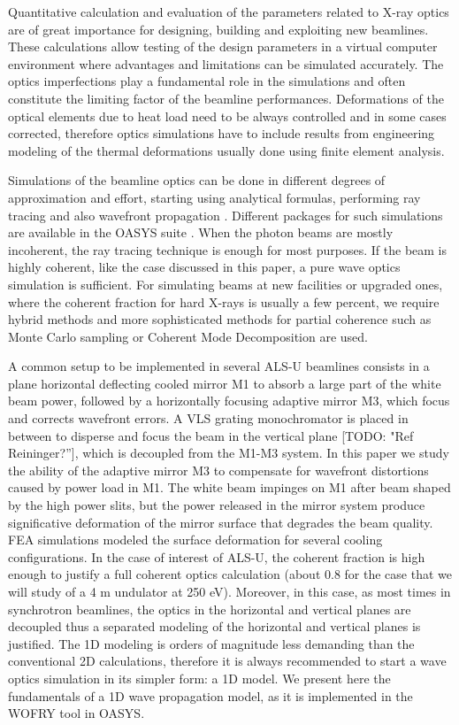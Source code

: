 \documentclass[]{spie}  %
\newcommand{\todo}[1]{{\color{red}[TODO: "#1'']}}
\begin{document}
Quantitative calculation and evaluation of the parameters related to X-ray optics are of great importance for designing, building and exploiting new beamlines. These calculations allow testing of the design parameters in a virtual computer environment where advantages and limitations can be simulated accurately. The optics imperfections play a fundamental role in the simulations and often constitute the limiting factor of the beamline performances. Deformations of the optical elements due to heat load need to be always controlled and in some cases corrected, therefore optics simulations have to include results from engineering modeling of the thermal deformations usually done using finite element analysis. 

Simulations of the beamline optics can be done in different degrees of approximation and effort, starting using analytical formulas, performing ray tracing and also wavefront propagation \cite{hyerarchical}. Different packages for such simulations are available in the OASYS suite \cite{codeOASYS}. When the photon beams are mostly incoherent, the ray tracing technique is enough for most purposes. If the beam is highly coherent, like the case discussed in this paper, a pure wave optics simulation is sufficient. For simulating beams at new facilities or upgraded ones, where the coherent fraction for hard X-rays is usually a few percent, we require  hybrid methods \cite{hybrid} and more sophisticated methods for partial coherence such as Monte Carlo sampling \cite{Chubar2011b} or Coherent Mode Decomposition \cite{codeCOMSYL} are used. 

A common setup to be implemented in several ALS-U beamlines consists in a plane horizontal deflecting cooled mirror M1 to absorb a large part of the white beam power, followed by a horizontally focusing adaptive mirror M3, which focus and corrects wavefront errors. A VLS grating monochromator is placed in between to disperse and focus the beam in the vertical plane \todo{Ref Reininger?}, which is decoupled from the M1-M3 system. In this paper we study the ability of the adaptive mirror M3 to compensate for wavefront distortions caused by power load in M1. The white beam impinges on M1 after beam shaped by the high power slits, but the power released in the mirror system produce significative deformation of the mirror surface that degrades the beam quality. FEA simulations modeled the surface deformation for several cooling configurations. In the case of interest of ALS-U, the coherent fraction is high enough  to justify a full coherent optics calculation (about 0.8 for the case that we will study of a 4 m undulator at 250 eV). Moreover, in this case, as most times in synchrotron beamlines, the optics in the horizontal and vertical planes are decoupled thus a separated modeling of the horizontal and vertical planes is justified. The 1D modeling is orders of magnitude less demanding than the conventional 2D calculations, therefore it is always recommended to start a wave optics simulation in its simpler form: a 1D model. We present here the fundamentals of a 1D wave propagation model, as it is implemented in the WOFRY \cite{codeWOFRY} tool in OASYS. 
\end{document}

